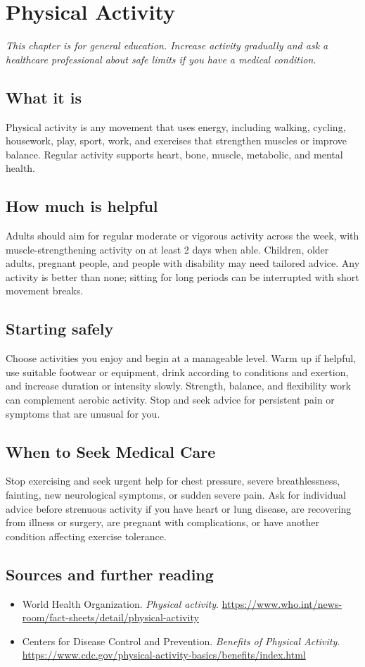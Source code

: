 \chapter{Physical Activity}

\medskip
\noindent\textit{This chapter is for general education. Increase activity gradually and ask a healthcare professional about safe limits if you have a medical condition.}

\section*{What it is}
Physical activity is any movement that uses energy, including walking, cycling, housework, play, sport, work, and exercises that strengthen muscles or improve balance. Regular activity supports heart, bone, muscle, metabolic, and mental health.

\section*{How much is helpful}
Adults should aim for regular moderate or vigorous activity across the week, with muscle-strengthening activity on at least 2 days when able. Children, older adults, pregnant people, and people with disability may need tailored advice. Any activity is better than none; sitting for long periods can be interrupted with short movement breaks.

\section*{Starting safely}
Choose activities you enjoy and begin at a manageable level. Warm up if helpful, use suitable footwear or equipment, drink according to conditions and exertion, and increase duration or intensity slowly. Strength, balance, and flexibility work can complement aerobic activity. Stop and seek advice for persistent pain or symptoms that are unusual for you.

\section*{When to Seek Medical Care}
Stop exercising and seek urgent help for chest pressure, severe breathlessness, fainting, new neurological symptoms, or sudden severe pain. Ask for individual advice before strenuous activity if you have heart or lung disease, are recovering from illness or surgery, are pregnant with complications, or have another condition affecting exercise tolerance.

\section*{Sources and further reading}
\begin{itemize}
\item World Health Organization. \textit{Physical activity}. \url{https://www.who.int/news-room/fact-sheets/detail/physical-activity}
\item Centers for Disease Control and Prevention. \textit{Benefits of Physical Activity}. \url{https://www.cdc.gov/physical-activity-basics/benefits/index.html}
\end{itemize}
